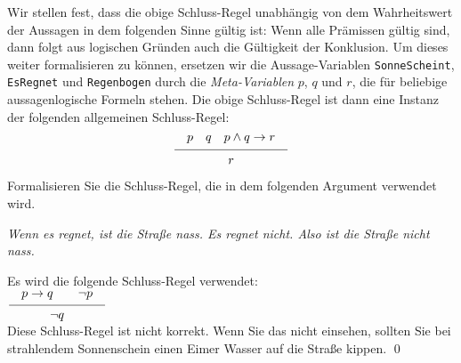  Wir stellen fest, dass die obige Schluss-Regel unabh\"{a}ngig von dem Wahrheitswert der Aussagen in dem folgenden Sinne
g\"{u}ltig ist: Wenn alle Pr\"{a}missen g\"{u}ltig sind, dann folgt aus logischen Gr\"{u}nden auch die G\"{u}ltigkeit der Konklusion.
 Um dieses weiter formalisieren zu k\"{o}nnen, ersetzen wir die Aussage-Variablen
 \texttt{SonneScheint}, \texttt{EsRegnet} und \texttt{Regenbogen} durch die
 \emph{Meta-Variablen} $p$, $q$ und $r$, die f\"{u}r beliebige aussagenlogische Formeln stehen.
  Die obige Schluss-Regel ist dann eine Instanz der folgenden allgemeinen Schluss-Regel:
$$ \schluss{p \quad q \quad p \wedge q \rightarrow r}{r}  $$

\exercise
Formalisieren Sie die Schluss-Regel, die in dem folgenden Argument verwendet wird.
\begin{center}
\begin{minipage}[c]{7.9cm}
\textsl{Wenn es regnet, ist die Stra\ss{}e nass.  Es regnet nicht.  Also ist die Stra\ss{}e nicht nass. \eox} 
\end{minipage}  
\end{center}

\solution
Es wird die folgende Schluss-Regel verwendet: \\[0.2cm]
\hspace*{1.3cm} $\schluss{p \rightarrow q \quad\quad \neg p}{\neg q}$\\[0.2cm]
Diese Schluss-Regel ist nicht korrekt.  Wenn Sie das nicht einsehen, sollten Sie bei strahlendem Sonnenschein einen Eimer Wasser
auf die Stra\ss{}e kippen.  \qed
\vspace*{0.1cm}

